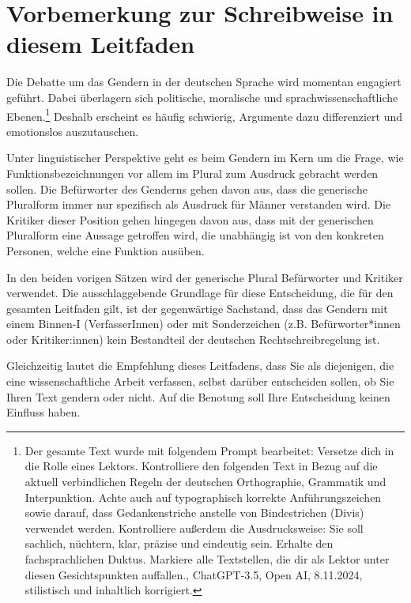 \chapter*{Vorbemerkung zur Schreibweise in diesem Leitfaden}
\label{chap:vorbemerkung}

Die Debatte um das Gendern in der deutschen Sprache wird momentan engagiert geführt. Dabei überlagern sich politische, moralische und sprachwissenschaftliche Ebenen.\footnote{Der gesamte Text wurde mit folgendem Prompt bearbeitet: \glqq Versetze dich in die Rolle eines Lektors. Kontrolliere den folgenden Text in Bezug auf die aktuell verbindlichen Regeln der deutschen Orthographie, Grammatik und Interpunktion. Achte auch auf typographisch korrekte Anführungszeichen sowie darauf, dass Gedankenstriche anstelle von Bindestrichen (Divis) verwendet werden. Kontrolliere außerdem die Ausdrucksweise: Sie soll sachlich, nüchtern, klar, präzise und eindeutig sein. Erhalte den fachsprachlichen Duktus. Markiere alle Textstellen, die dir als Lektor unter diesen Gesichtspunkten auffallen.\grqq{}, ChatGPT-3.5, Open AI, 8.11.2024, stilistisch und inhaltlich korrigiert.} Deshalb erscheint es häufig schwierig, Argumente dazu differenziert und emotionslos auszutauschen.

Unter linguistischer Perspektive geht es beim Gendern im Kern um die Frage, wie Funktionsbezeichnungen vor allem im Plural zum Ausdruck gebracht werden sollen. Die Befürworter des Genderns gehen davon aus, dass die generische Pluralform immer nur spezifisch als Ausdruck für Männer verstanden wird. Die Kritiker dieser Position gehen hingegen davon aus, dass mit der generischen Pluralform eine Aussage getroffen wird, die unabhängig ist von den konkreten Personen, welche eine Funktion ausüben.

In den beiden vorigen Sätzen wird der generische Plural \glqq Befürworter\grqq{} und \glqq Kritiker\grqq{} verwendet. Die ausschlaggebende Grundlage für diese Entscheidung, die für den gesamten Leitfaden gilt, ist der gegenwärtige Sachstand, dass das Gendern mit einem Binnen-I (\glqq VerfasserInnen\grqq{}) oder mit Sonderzeichen (z.B. \glqq Befürworter*innen\grqq{} oder \glqq Kritiker:innen\grqq{}) kein Bestandteil der deutschen Rechtschreibregelung ist.

Gleichzeitig lautet die Empfehlung dieses Leitfadens, dass Sie als diejenigen, die eine wissenschaftliche Arbeit verfassen, selbst darüber entscheiden sollen, ob Sie Ihren Text gendern oder nicht. Auf die Benotung soll Ihre Entscheidung keinen Einfluss haben.

